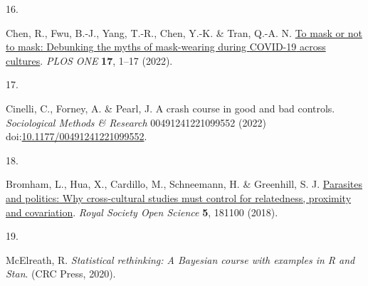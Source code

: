 \documentclass[
  man, donotrepeattitle,floatsintext]{apa6}
\newlength{\cslhangindent}
\newlength{\csllabelwidth}
\newlength{\cslentryspacingunit} %
\newenvironment{CSLReferences}[2] %
 {%
  \setlength{\parindent}{0pt}
  \ifodd #1
  \let\oldpar\par
  \def\par{\hangindent=\cslhangindent\oldpar}
  \fi
  \setlength{\parskip}{#2\cslentryspacingunit}
 }%
 {}
\newcommand{\CSLLeftMargin}[1]{\parbox[t]{\csllabelwidth}{#1}}
\newcommand{\CSLRightInline}[1]{\parbox[t]{\linewidth - \csllabelwidth}{#1}\break}
\begin{document}
\begin{CSLReferences}{0}{0}
\leavevmode{}%
\CSLLeftMargin{16. }%
\CSLRightInline{Chen, R., Fwu, B.-J., Yang, T.-R., Chen, Y.-K. \& Tran, Q.-A. N. \href{https://doi.org/10.1371/journal.pone.0270160}{To mask or not to mask: Debunking the myths of mask-wearing during {COVID-19} across cultures}. \emph{PLOS ONE} \textbf{17}, 1--17 (2022).}

\leavevmode{}%
\CSLLeftMargin{17. }%
\CSLRightInline{Cinelli, C., Forney, A. \& Pearl, J. A crash course in good and bad controls. \emph{Sociological Methods \& Research} 00491241221099552 (2022) doi:\href{https://doi.org/10.1177/00491241221099552}{10.1177/00491241221099552}.}

\leavevmode{}%
\CSLLeftMargin{18. }%
\CSLRightInline{Bromham, L., Hua, X., Cardillo, M., Schneemann, H. \& Greenhill, S. J. \href{https://doi.org/10.1098/rsos.181100}{Parasites and politics: Why cross-cultural studies must control for relatedness, proximity and covariation}. \emph{Royal Society Open Science} \textbf{5}, 181100 (2018).}

\leavevmode{}%
\CSLLeftMargin{19. }%
\CSLRightInline{McElreath, R. \emph{Statistical rethinking: A {B}ayesian course with examples in {R} and {Stan}}. (CRC Press, 2020).}

\end{CSLReferences}

\endgroup
\end{document}
